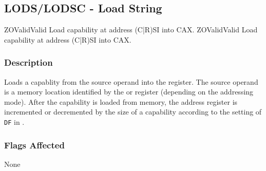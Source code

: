 \clearpage
{}
{}
\subsection*{LODS/LODSC - Load String}

\begin{x86opcodetable}
  {ZO}{Valid}{Valid}
  {Load capability at address (C|R)SI into CAX.}
  {ZO}{Valid}{Valid}
  {Load capability at address (C|R)SI into CAX.}
\end{x86opcodetable}

\begin{x86opentable}
\end{x86opentable}

\subsubsection*{Description}

Loads a capablity from the source operand into the \CAX{} register.
The source operand is a memory location identified by the \RSI{} or
\CSI{} register (depending on the addressing mode).  After the
capability is loaded from memory, the address register is incremented
or decremented by the size of a capability according to the setting of
\texttt{DF} in \RFLAGS{}.

\subsubsection*{Flags Affected}

None
